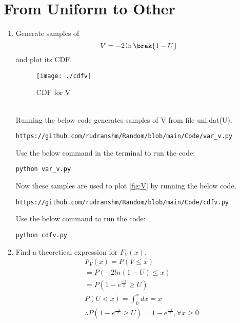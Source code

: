 \documentclass[journal,12pt,twocolumn]{IEEEtran}
\begin{document}
\section{From Uniform to Other}
\begin{enumerate}[label=\thesection.\arabic*
,ref=\thesection.\theenumi]
%
\item
Generate samples of 
%
\begin{equation}
V = -2\ln\brak{1-U}
\end{equation}
%
and plot its CDF.\\ 
 \begin{figure}[h]
\texttt{[image: ./cdfv]}
\caption{CDF for V}
\label{fig:V}
\end{figure}
\\ 
\solution
Running the below code generates samples of V from file uni.dat(U).
\begin{lstlisting}
https://github.com/rudranshm/Random/blob/main/Code/var_v.py
\end{lstlisting}
Use the below command in the terminal to run the code:
\begin{lstlisting}
python var_v.py
\end{lstlisting}
 
Now these samples are used to plot \eqref{fig:V} by running the below code,
\begin{lstlisting}
https://github.com/rudranshm/Random/blob/main/Code/cdfv.py
\end{lstlisting}
Use the below command to run the code:
\begin{lstlisting}
python cdfv.py
\end{lstlisting}
\item Find a theoretical expression for $F_V(x)$.
\begin{align}
 &F_{V}(x)=P(V \leq x)\\
 &=P(-2 ln(1-U) \leq x)\\
 &=P(1-e^{\frac{-x}{2}} \geq U)\\
 &P(U<x)=\int_{0}^{x} dx=x\\
 &\therefore P(1-e^{\frac{-x}{2}} \geq U)=1-e^{\frac{-x}{2}}, \forall x\geq 0 \\ 
 \nonumber
 \end{align}


\end{enumerate}
\end{document}

